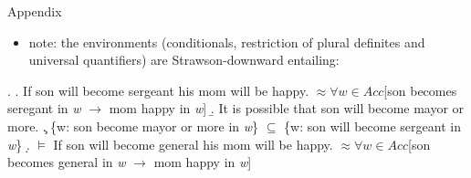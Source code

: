 \documentclass[ignorenonframetext,]{beamer}
\providecommand{\tightlist}{%
  \setlength{\itemsep}{0pt}\setlength{\parskip}{0pt}}
\begin{document}
\begin{frame}{Appendix}

\begin{itemize}
\tightlist
\item
  note: the environments (conditionals, restriction of plural definites
  and universal quantifiers) are Strawson-downward entailing:
\end{itemize}

\ex. \a. If son will become sergeant his mom will be happy.\newline
\(\approx \forall w \in Acc\){[}son becomes seregant in \emph{w}
\(\rightarrow\) mom happy in \emph{w}{]} \b. It is possible that son
will become mayor or more. \c. \{w: son become mayor or more in
\emph{w}\} \(\subseteq\) \{w: son will become sergeant in \emph{w}\} \d.
\(\models\) If son will become general his mom will be happy.\newline
\(\approx \forall w \in Acc\){[}son becomes general in \emph{w}
\(\rightarrow\) mom happy in \emph{w}{]}

\end{frame}
\end{document}
